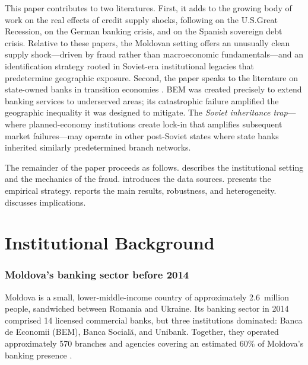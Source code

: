 \documentclass[12pt]{article}
\begin{document}
This paper contributes to two literatures. First, it adds to the growing body of work on the real effects of credit supply shocks, following \citet{chodorow2014employment} on the U.S.\@ Great Recession, \citet{huber2018disentangling} on the German banking crisis, and \citet{bentolila2018firms} on the Spanish sovereign debt crisis. Relative to these papers, the Moldovan setting offers an unusually clean supply shock---driven by fraud rather than macroeconomic fundamentals---and an identification strategy rooted in Soviet-era institutional legacies that predetermine geographic exposure. Second, the paper speaks to the literature on state-owned banks in transition economies \citep{la_porta2002government, sapienza2004effects, dinc2005politicians}. BEM was created precisely to extend banking services to underserved areas; its catastrophic failure amplified the geographic inequality it was designed to mitigate. The \emph{Soviet inheritance trap}---where planned-economy institutions create lock-in that amplifies subsequent market failures---may operate in other post-Soviet states where state banks inherited similarly predetermined branch networks.

The remainder of the paper proceeds as follows.  describes the institutional setting and the mechanics of the fraud.  introduces the data sources.  presents the empirical strategy.  reports the main results, robustness, and heterogeneity.  discusses implications.


\section{Institutional Background}
\label{sec:background}

\subsubsection*{Moldova's banking sector before 2014} Moldova is a small, lower-middle-income country of approximately 2.6~million people, sandwiched between Romania and Ukraine. Its banking sector in 2014 comprised 14 licensed commercial banks, but three institutions dominated: Banca de Economii (BEM), Banca Social\u{a}, and Unibank. Together, they operated approximately 570 branches and agencies covering an estimated 60\% of Moldova's banking presence \citep{kroll2015report}.
\end{document}

